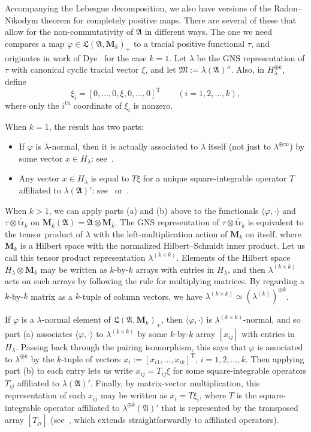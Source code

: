 \documentclass[12pt,a4paper]{article}
\numberwithin{equation}{section}
\theoremstyle{remark}
\renewcommand{\rm}[1]{\mathrm{#1}}
\newcommand{\rmM}{\mathbf{M}}
\newcommand{\A}{\mathfrak{A}}
\newcommand{\frL}{\mathfrak{L}}
\newcommand{\M}{\mathfrak{M}}
\renewcommand{\phi}{\varphi}
\renewcommand{\l}{\lambda}
\newcommand{\tr}{\overline{\mathrm{tr}}}
\begin{document}
Accompanying the Lebesgue decomposition, we also have versions of the Radon--Nikodym theorem for completely positive maps.  There are several of these that allow for the non-commutativity of $\A$ in different ways.  The one we need compares a map $\phi \in \frL(\A,\rmM_k)_+$ to a tracial positive functional $\tau$, and originates in work of Dye~\cite{Dye52} for the case $k=1$.  Let $\l$ be the GNS representation of $\tau$ with canonical cyclic tracial vector $\xi$, and let $\M := \l(\A)''$.  Also, in $H_\l^{\oplus k}$, define
\begin{equation}\label{eq:xi-i}
	\xi_i = [0,\dots,0,\xi,0,\dots,0]^\rm{T} \qquad (i=1,2,\dots,k),
	\end{equation}
where only the $i^\rm{th}$ coordinate of $\xi_i$ is nonzero.

When $k=1$, the result has two parts:
\begin{itemize}
\item[a.] If $\phi$ is $\l$-normal, then it is actually associated to $\l$ itself (not just to $\l^{\oplus \infty}$) by some vector $x \in H_\l$: see~\cite[Thm. III.1.4]{Dix--vN}.
\item[b.] Any vector $x \in H_\l$ is equal to $T\xi$ for a unique square-integrable operator $T$ affiliated to $\l(\A)'$: see~\cite[Exers. III.1.13]{Dix--vN} or~\cite[Prop. F.11]{BroOza08}. %
\end{itemize}

When $k > 1$, we can apply parts (a) and (b) above to the functionals $\langle \phi,\cdot\rangle$ and $\tau \otimes \tr_k$ on $\rmM_k(\A) = \A\otimes \rmM_k$.  The GNS representation of $\tau\otimes \tr_k$ is equivalent to the tensor product of $\l$ with the left-multiplication action of $\rmM_k$ on itself, where $\rmM_k$ is a Hilbert space with the normalized Hilbert--Schmidt inner product.  Let us call this tensor product representation $\l^{(k\times k)}$.  Elements of the Hilbert space $H_\l\otimes \rmM_k$ may be written as $k$-by-$k$ arrays with entries in $H_\l$, and then $\l^{(k\times k)}$ acts on such arrays by following the rule for multiplying matrices.  By regarding a $k$-by-$k$ matrix as a $k$-tuple of column vectors, we have $\l^{(k\times k)} \simeq (\l^{(k)})^{\oplus k}$.

If $\phi$ is a $\l$-normal element of $\frL(\A,\rmM_k)_+$, then $\langle \phi,\cdot\rangle$ is $\l^{(k\times k)}$-normal, and so part (a) associates $\langle \phi,\cdot \rangle$ to $\l^{(k\times k)}$ by some $k$-by-$k$ array $[x_{ij}]$ with entries in $H_\l$.  Passing back through the pairing isomorphism, this says that $\phi$ is associated to $\l^{\oplus k}$ by the $k$-tuple of vectors $x_i := [x_{i1},\dots,x_{ik}]^\rm{T}$, $i=1,2,\dots,k$.  Then applying part (b) to each entry lets us write $x_{ij} = T_{ij}\xi$ for some square-integrable operators $T_{ij}$ affiliated to $\l(\A)'$.  Finally, by matrix-vector multiplication, this representation of each $x_{ij}$ may be written as $x_i = T\xi_i$, where $T$ is the square-integrable operator affiliated to $\l^{\oplus k}(\A)'$ that is represented by the transposed array $[T_{ji}]$ (see~\cite[Prop. I.2.4]{Dix--vN}, which extends straightforwardly to affiliated operators).
\end{document}
